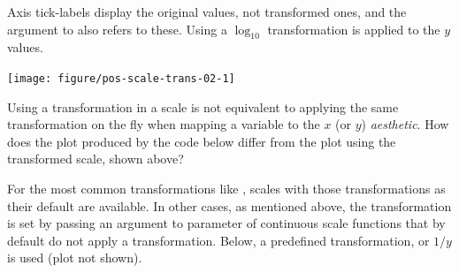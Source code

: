 \documentclass[krantz2]{krantz}\usepackage{knitr}
\begin{document}
Axis tick-labels display the original values, not transformed ones, and the argument to  also refers to these. Using  a $\log_{10}$ transformation is applied to the $y$ values.

\begin{knitrout}\footnotesize
{}\color{fgcolor}\begin{kframe}
\begin{alltt}
\hlstd{(}   \hlstd{=} \hlstd{(}    \hlopt{+}
  \hlstd{()} \hlopt{+}
  \hlstd{(}\hlstd{=}\hlstd{(}\hlstd{,}\hlstd{,}\hlstd{,}\hlstd{))}
\end{alltt}
\end{kframe}

{\centering \texttt{[image: figure/pos-scale-trans-02-1]} 

}


\end{knitrout}

\begin{playground}
Using a transformation in a scale is not equivalent to applying the same transformation on the fly when mapping a variable to the $x$  (or $y$) \emph{aesthetic}. How does the plot produced by the code below differ from the plot using the transformed scale, shown above?

\begin{knitrout}\footnotesize
{}\color{fgcolor}\begin{kframe}
\begin{alltt}
\hlstd{(}   \hlstd{=} \hlstd{(}   \hlstd{=}  \hlopt{+}
  \hlstd{()}
\end{alltt}
\end{kframe}
\end{knitrout}
\end{playground}

For the most common transformations like , scales with those transformations as their default are available. In other cases, as mentioned above, the transformation is set by passing an argument to parameter  of continuous scale functions that by default do not apply a transformation. Below, a predefined transformation,  or $1/y$ is used (plot not shown).
\end{document}
